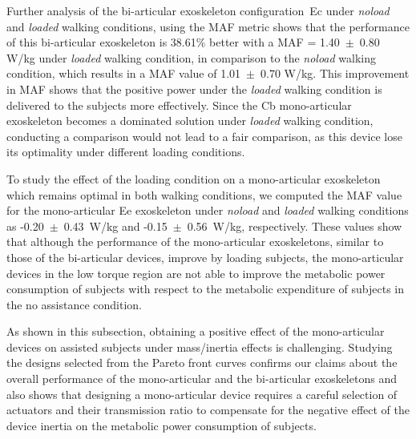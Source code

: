 \documentclass[10pt,letterpaper]{article}
\begin{document}
Further analysis of the bi-articular exoskeleton configuration~Ec under \emph{noload} and \emph{loaded} walking conditions, using the MAF metric shows that the performance of this bi-articular exoskeleton is 38.61\% better with a MAF = 1.40~$\pm$~0.80 W/kg under \emph{loaded} walking condition, in comparison to the \emph{noload} walking condition, which results in a MAF value of 1.01~$\pm$~0.70 W/kg. This improvement in MAF shows that the positive power under the \emph{loaded} walking condition is delivered to the subjects more effectively. Since the Cb mono-articular exoskeleton becomes a dominated solution under \emph{loaded} walking condition,  conducting a comparison would not lead to a fair comparison, as this device lose its optimality under different loading conditions.


To study the effect of the loading condition on a mono-articular exoskeleton which remains optimal in both walking conditions, we computed the MAF value for the mono-articular Ee exoskeleton under \emph{noload} and \emph{loaded} walking conditions as -0.20~$\pm$~0.43~W/kg and -0.15~$\pm$~0.56~W/kg, respectively. These values show that although the performance of the mono-articular exoskeletons, similar to those of the bi-articular devices, improve by loading subjects, the mono-articular devices in the low torque region are not able to improve the metabolic power consumption of subjects with respect to the metabolic expenditure of subjects in the no assistance condition. %
	
As shown in this subsection, obtaining a positive effect of the mono-articular devices on assisted subjects under mass/inertia effects is challenging. Studying the designs selected from the Pareto front curves confirms our claims about the overall performance of the mono-articular and the bi-articular exoskeletons and also shows that designing a mono-articular device requires a careful selection of actuators and their transmission ratio to compensate for the negative effect of the device inertia on the metabolic power consumption of subjects.
\end{document}
